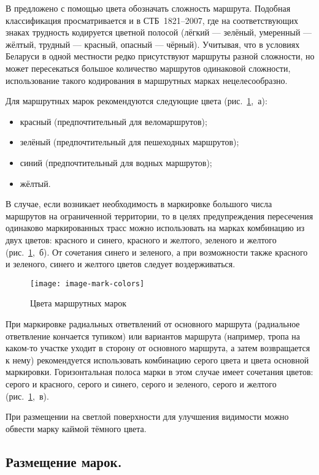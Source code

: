 \documentclass[a4paper,12pt,titlepage]{extarticle}
\begin{document}
В \cite{metodussr} предложено с помощью цвета обозначать сложность маршрута. Подобная классификация просматривается и в
СТБ~1821--2007, где на соответствующих знаках трудность кодируется цветной полосой  (лёгкий --- зелёный, умеренный ---
жёлтый, трудный --- красный, опасный --- чёрный). Учитывая, что в условиях Беларуси в одной местности редко присутствуют
маршруты разной сложности, но может пересекаться большое количество маршрутов одинаковой сложности, использование такого
кодирования в маршрутных марках нецелесообразно.

Для маршрутных марок рекомендуются следующие цвета (рис.~\ref{fig:mark-colors},~а):
\begin{itemize}
	\item красный (предпочтительный для веломаршрутов);
	\item зелёный (предпочтительный для пешеходных маршрутов);
	\item синий (предпочтительный для водных маршрутов);
	\item жёлтый.
\end{itemize}

В случае, если возникает необходимость в маркировке большого числа маршрутов на ограниченной территории, то в целях
предупреждения пересечения одинаково маркированных трасс можно использовать на марках комбинацию из двух цветов:
красного и синего, красного и желтого, зеленого и желтого (рис.~\ref{fig:mark-colors},~б). От сочетания синего и зеленого, а при возможности
также красного и зеленого, синего и желтого цветов следует воздерживаться.

\begin{figure}[ht]
	\centering
	\texttt{[image: image-mark-colors]}
	\caption{Цвета маршрутных марок}\label{fig:mark-colors}
\end{figure}


При маркировке радиальных ответвлений от основного маршрута (радиальное ответвление кончается тупиком) или вариантов
маршрута (например, тропа на каком-то участке уходит в сторону от основного маршрута, а затем возвращается к нему)
рекомендуется использовать комбинацию серого цвета и цвета основной маркировки. Горизонтальная полоса  марки в этом
случае имеет сочетания цветов: серого и красного, серого и синего, серого и зеленого, серого и желтого (рис.~\ref{fig:mark-colors},~в).

При размещении на светлой поверхности для улучшения видимости можно обвести марку каймой тёмного цвета.

\subsection{Размещение марок.}
\end{document}

